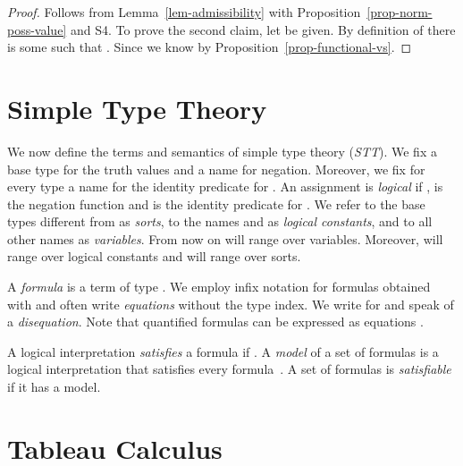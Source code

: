 \begin{proof}
  Follows from Lemma~\ref{lem-admissibility} with
  Proposition~\ref{prop-norm-poss-value} and S4.
  To prove the second claim, let  be given.  By definition of  there is some  such that .
  Since  we know  by
  Proposition~\ref{prop-functional-vs}. \end{proof}










\section{Simple Type Theory}

We now define the terms and semantics of simple type theory (\emph{STT}).
We fix a base type  for the truth values and a
name  for negation.
Moreover, we fix for every type
 a name  for the
identity predicate for .
An assignment
 is \emph{logical} if ,
 is the negation
function and  is the identity
predicate for .
We refer to the base types
different from  as \emph{sorts}, to the names
 and  as \emph{logical constants}, 
and to all other names as \emph{variables}.  
From now on \emph{} will range
over variables. Moreover, \emph{} will range over logical constants
and \emph{} will range over sorts.

A \emph{formula} is a term of type .  We employ
infix notation for formulas obtained with 
 and often write \emph{equations}  without the type index.  
We write \emph{} for 
and speak of a \emph{disequation}.
Note that
quantified formulas  can be expressed as
equations .

A logical interpretation  \emph{satisfies}
a formula  if .  A \emph{model} of a
set of formulas  is a logical interpretation
that satisfies every formula~.  A set of
formulas is \emph{satisfiable} if it has a model.

\section{Tableau Calculus}

